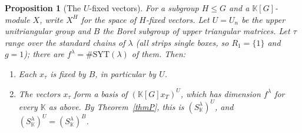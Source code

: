 \documentclass[11pt, letterpaper]{amsart}
\newtheorem{proposition}{Proposition}
\theoremstyle{definition}
\theoremstyle{remark}
\newcommand{\KK}{\mathbb{K}}
\begin{document}
\begin{proposition}[The $U$-fixed vectors]\label{propU}
For a subgroup $H\le G$ and a $\KK[G]$-module $X$, write $X^H$ for the space of $H$-fixed vectors. Let $U=U_n$ be the upper unitriangular group and $B$ the Borel subgroup of upper triangular matrices. Let $\tau$ range over the standard chains of $\lambda$ (all strips single boxes, so $R_1=\{1\}$ and $g=1$); there are $f^\lambda=\#\mathrm{SYT}(\lambda)$ of them. Then:
\begin{enumerate}
\item[(a)] Each $x_\tau$ is fixed by $B$, in particular by $U$.
\item[(b)] The vectors $x_\tau$ form a basis of $(\KK[G]x_T)^U$, which has dimension $f^\lambda$ for every $\KK$ as above. By Theorem~\ref{thmP}, this is $(S^\lambda_\KK)^U$, and $(S^\lambda_\KK)^U=(S^\lambda_\KK)^B$.
\end{enumerate}
\end{proposition}
\end{document}
